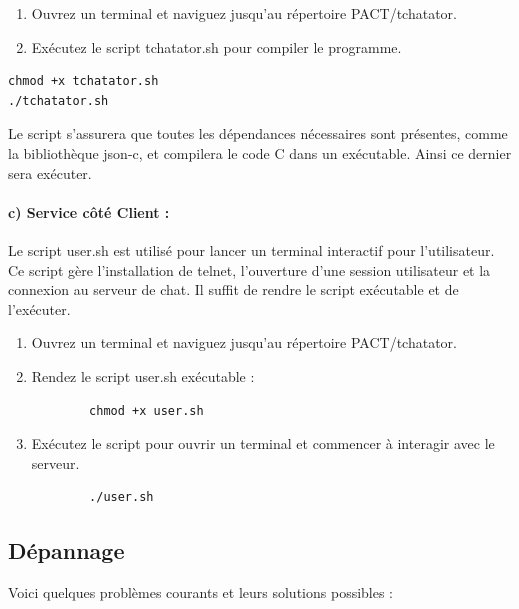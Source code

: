 \documentclass{report}
\begin{document}
\begin{enumerate}
	\item Ouvrez un terminal et naviguez jusqu'au répertoire PACT/tchatator.
	\item Exécutez le script tchatator.sh pour compiler le programme.
\end{enumerate}

\begin{verbatim}
chmod +x tchatator.sh
./tchatator.sh
\end{verbatim}

Le script s'assurera que toutes les dépendances nécessaires sont présentes, comme la bibliothèque json-c, et compilera le code C dans un exécutable. Ainsi ce dernier sera exécuter.

\paragraph{c) Service côté Client :}

Le script user.sh est utilisé pour lancer un terminal interactif pour l'utilisateur. Ce script gère l'installation de telnet, l'ouverture d'une session utilisateur et la connexion au serveur de chat. Il suffit de rendre le script exécutable et de l'exécuter.

\begin{enumerate}
	\item Ouvrez un terminal et naviguez jusqu'au répertoire PACT/tchatator.
	
	\item Rendez le script user.sh exécutable :
	\begin{verbatim}
		chmod +x user.sh
	\end{verbatim}
	
	\item Exécutez le script pour ouvrir un terminal et commencer à interagir avec le serveur.
	
	\begin{verbatim}
		./user.sh
	\end{verbatim}
\end{enumerate}

\subsection{Dépannage}

Voici quelques problèmes courants et leurs solutions possibles :
\end{document}
